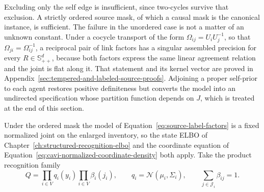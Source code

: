 Excluding only the self edge is insufficient, since two-cycles survive that exclusion. A strictly ordered source mask, of which a causal mask is the canonical instance, is sufficient. The failure in the unordered case is not a matter of an unknown constant. Under a cocycle transport of the form \(\Omega_{ij}=U_iU_j^{-1}\), so that \(\Omega_{ji}=\Omega_{ij}^{-1}\), a reciprocal pair of link factors has a singular assembled precision for every \(R\in\mathbb S_{++}^{d}\), because both factors express the same linear agreement relation and the joint is flat along it. That statement and its kernel vector are proved in Appendix~\ref{sec:tempered-and-labeled-source-proofs}. Adjoining a proper self-prior to each agent restores positive definiteness but converts the model into an undirected specification whose partition function depends on \(J\), which is treated at the end of this section.

Under the ordered mask the model of Equation~\eqref{eq:source-label-factors} is a fixed normalized joint on the enlarged inventory, so the state ELBO of Chapter~\ref{ch:structured-recognition-elbo} and the coordinate equation of Equation~\eqref{eq:cavi-normalized-coordinate-density} both apply. Take the product recognition family
\begin{equation}
Q=\prod_{i\in V}q_i(y_i)\prod_{i\in V}\beta_i(j_i),
\qquad
q_i=\mathcal N(\mu_i,\Sigma_i),
\qquad
\sum_{j\in\mathcal J_i}\beta_{ij}=1.
\label{eq:source-label-recognition-family}
\end{equation}

